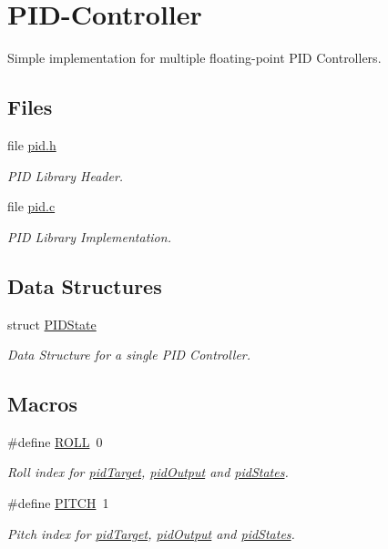 \hypertarget{group__pid}{\section{P\-I\-D-\/\-Controller}
\label{group__pid}
}


Simple implementation for multiple floating-\/point P\-I\-D Controllers.  


\subsection*{Files}
\begin{DoxyCompactItemize}
\item 
file \hyperlink{pid_8h}{pid.\-h}
\begin{DoxyCompactList}\small\item\em P\-I\-D Library Header. \end{DoxyCompactList}\item 
file \hyperlink{pid_8c}{pid.\-c}
\begin{DoxyCompactList}\small\item\em P\-I\-D Library Implementation. \end{DoxyCompactList}\end{DoxyCompactItemize}
\subsection*{Data Structures}
\begin{DoxyCompactItemize}
\item 
struct \hyperlink{struct_p_i_d_state}{P\-I\-D\-State}
\begin{DoxyCompactList}\small\item\em Data Structure for a single P\-I\-D Controller. \end{DoxyCompactList}\end{DoxyCompactItemize}
\subsection*{Macros}
\begin{DoxyCompactItemize}
\item 
\#define \hyperlink{group__pid_gaf902416f65138704a180dbae2dc9d8f2}{R\-O\-L\-L}~0
\begin{DoxyCompactList}\small\item\em Roll index for \hyperlink{group__pid_ga260bc1ef7a231f2252e6e69e1e459ba6}{pid\-Target}, \hyperlink{group__pid_ga5b70790e470e0c5812d24a8a098c01e0}{pid\-Output} and \hyperlink{group__pid_ga9ce36f9a8e0e12e30b448e0161e3e5ec}{pid\-States}. \end{DoxyCompactList}\item 
\#define \hyperlink{group__pid_gacd633835a520a62245ec6cfeb6d00e97}{P\-I\-T\-C\-H}~1
\begin{DoxyCompactList}\small\item\em Pitch index for \hyperlink{group__pid_ga260bc1ef7a231f2252e6e69e1e459ba6}{pid\-Target}, \hyperlink{group__pid_ga5b70790e470e0c5812d24a8a098c01e0}{pid\-Output} and \hyperlink{group__pid_ga9ce36f9a8e0e12e30b448e0161e3e5ec}{pid\-States}. \end{DoxyCompactList}\end{DoxyCompactItemize}
